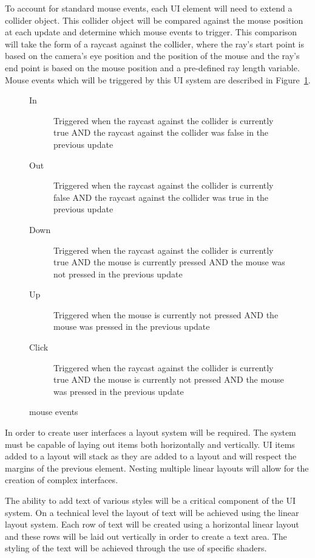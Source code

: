 \documentclass{GlobalDocument}
\begin{document}
To account for standard mouse events, each UI element will need to extend a collider object. This collider object will be compared against the mouse position at each update and determine which mouse events to trigger. This comparison will take the form of a raycast against the collider, where the ray's start point is based on the camera's eye position and the position of the mouse and the ray's end point is based on the mouse position and a pre-defined ray length variable. Mouse events which will be triggered by this UI system are described in Figure~\ref{fig:mouse_events}.

\begin{figure}[htb]

\begin{description}
\item[In]{Triggered when the raycast against the collider is currently true AND the raycast against the collider was false in the previous update}
\item[Out]{Triggered when the raycast against the collider is currently false AND the raycast against the collider was true in the previous update}
\item[Down]{Triggered when the raycast against the collider is currently true AND the mouse is currently pressed AND the mouse was not pressed in the previous update}
\item[Up]{Triggered when the mouse is currently not pressed AND the mouse was pressed in the previous update}
\item[Click]{Triggered when the raycast against the collider is currently true AND the mouse is currently not pressed AND the mouse was pressed in the previous update}
\end{description}
\caption{\ourengine{} mouse events}
\label{fig:mouse_events}
\end{figure}

In order to create user interfaces a layout system will be required. The system must be capable of laying out items both horizontally and vertically. UI items added to a layout will stack as they are added to a layout and will respect the margins of the previous element. Nesting multiple linear layouts will allow for the creation of complex interfaces. 

The ability to add text of various styles will be a critical component of the UI system. On a technical level the layout of text will be achieved using the linear layout system. Each row of text will be created using a horizontal linear layout and these rows will be laid out vertically in order to create a text area. The styling of the text will be achieved through the use of specific shaders. 
\end{document}
